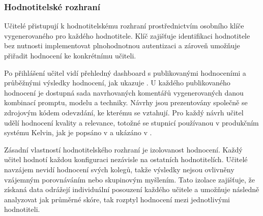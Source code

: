 \subsubsection{Hodnotitelské rozhraní}
\label{subsubsec:implementation-tool-rating}

Učitelé přistupují k hodnotitelskému rozhraní prostřednictvím osobního klíče vygenerovaného pro každého hodnotitele.
Klíč zajišťuje identifikaci hodnotitele bez nutnosti implementovat plnohodnotnou autentizaci a zároveň umožňuje přiřadit hodnocení ke konkrétnímu učiteli.

Po přihlášení učitel vidí přehledný dashboard s publikovanými hodnoceními a průběžnými výsledky hodnocení, jak ukazuje .
U každého publikovaného hodnocení je dostupná sada navrhovaných komentářů vygenerovaných danou kombinací promptu, modelu a techniky.
Návrhy jsou prezentovány společně se zdrojovým kódem odevzdání, ke kterému se vztahují.
Pro každý návrh učitel udělí hodnocení kvality a relevance, totožné se stupnicí používanou v produkčním systému Kelvin, jak je popsáno v  a ukázáno v .

Zásadní vlastností hodnotitelského rozhraní je izolovanost hodnocení.
Každý učitel hodnotí každou konfiguraci nezávisle na ostatních hodnotitelích.
Učitelé navzájem nevidí hodnocení svých kolegů, takže výsledky nejsou ovlivněny vzájemným porovnáváním nebo skupinovým myšlením.
Tato izolace zajišťuje, že získaná data odrážejí individuální posouzení každého učitele a umožňuje následně analyzovat jak průměrné skóre, tak rozptyl hodnocení mezi jednotlivými hodnotiteli.

\endinput